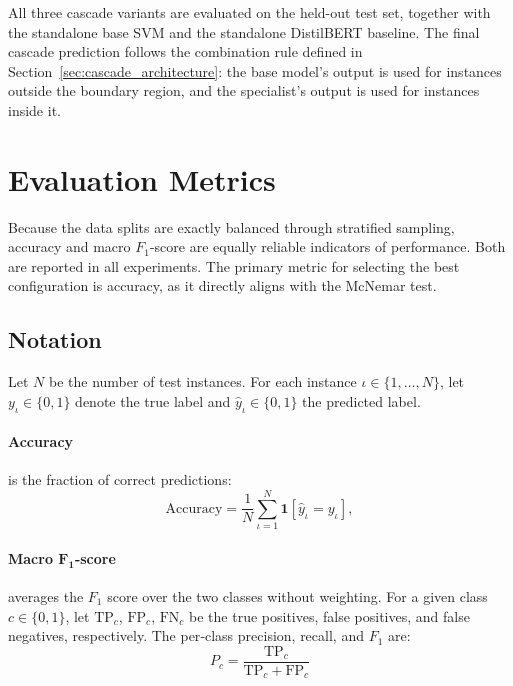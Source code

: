 \documentclass[a4paper,twoside,12pt]{book}
\newcommand{\instanceClass}{c}
\newcommand{\predVal}{y}
\newcommand{\idx}{\iota}
\newcommand{\numVal}{N}
\begin{document}
All three cascade variants are evaluated on the held-out test set, together with the standalone base SVM and the standalone DistilBERT baseline. The final cascade prediction follows the combination rule defined in Section~\ref{sec:cascade_architecture}: the base model's output is used for instances outside the boundary region, and the specialist's output is used for instances inside it.

\section{Evaluation Metrics}

Because the data splits are exactly balanced through stratified sampling, accuracy and macro $F_1$-score are equally reliable indicators of performance. Both are reported in all experiments. The primary metric for selecting the best configuration is accuracy, as it directly aligns with the McNemar test.

\subsection{Notation}
Let $\numVal$ be the number of test instances. For each instance $\idx \in \{1,\dots,\numVal\}$, let $\predVal_{\idx} \in \{0,1\}$ denote the true label and $\hat{\predVal}_{\idx} \in \{0,1\}$ the predicted label.

\paragraph{Accuracy} is the fraction of correct predictions:
\begin{equation}
	\text{Accuracy} = \frac{1}{\numVal} \sum_{\idx=1}^{\numVal} \mathbf{1}[\hat{\predVal}_{\idx} = \predVal_{\idx}],
\end{equation}

\paragraph{Macro $\mathbf{F_1}$-score} averages the $F_1$ score over the two classes without weighting.
For a given class $\instanceClass \in \{0,1\}$, let $\text{TP}_{\instanceClass}$, $\text{FP}_{\instanceClass}$, $\text{FN}_{\instanceClass}$ be the true positives, false positives, and false negatives, respectively.
The per‑class precision, recall, and $F_1$ are:
\begin{equation}	
	P_{\instanceClass} = 	\frac{\text{TP}_{\instanceClass}}{\text{TP}_{\instanceClass} + \text{FP}_{\instanceClass}}
\end{equation}
\end{document}
